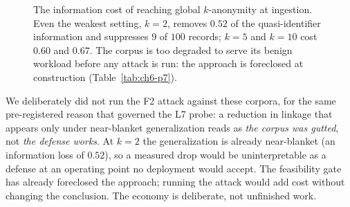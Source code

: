 \documentclass[12pt,a4paper]{report}
\begin{document}
\begin{figure}[h]
\centering
{}
\caption[The information cost of ingestion-time $k$-anonymity (P7)]{The information cost of
reaching global $k$-anonymity at ingestion. Even the weakest setting, $k{=}2$, removes $0.52$ of
the quasi-identifier information and suppresses $9$ of $100$ records; $k{=}5$ and $k{=}10$ cost
$0.60$ and $0.67$. The corpus is too degraded to serve its benign workload before any attack is
run: the approach is foreclosed at construction (Table~\ref{tab:ch6-p7}).}
\label{fig:ch6-p7infoloss}
\end{figure}

We deliberately did not run the F2 attack against these corpora, for the same pre-registered reason that
governed the L7 probe: a reduction in linkage that appears only under near-blanket generalization reads as
\emph{the corpus was gutted}, not \emph{the defense works}. At $k=2$ the generalization is already
near-blanket (an information loss of $0.52$), so a measured drop would be uninterpretable as a defense at
an operating point no deployment would accept. The feasibility gate has already foreclosed the approach;
running the attack would add cost without changing the conclusion. The economy is deliberate, not
unfinished work.
\end{document}

